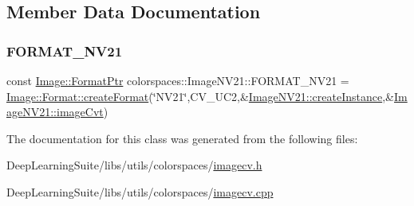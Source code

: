\subsection{Member Data Documentation}
\mbox{\label{classcolorspaces_1_1_image_n_v21_aa7e4ffadaba25b5b888123c955c63499}} 
\subsubsection{\texorpdfstring{F\+O\+R\+M\+A\+T\+\_\+\+N\+V21}{FORMAT\_NV21}}
{\footnotesize\ttfamily const \hyperlink{classcolorspaces_1_1_image_ab3978cc7acc2b5e855f8c715f09667d1}{Image\+::\+Format\+Ptr} colorspaces\+::\+Image\+N\+V21\+::\+F\+O\+R\+M\+A\+T\+\_\+\+N\+V21 = \hyperlink{classcolorspaces_1_1_image_1_1_format_ae79208f237b72cf596331ebcec2ff58b}{Image\+::\+Format\+::create\+Format}(\char`\"{}N\+V21\char`\"{},C\+V\+\_\+U\+C2,\&\hyperlink{classcolorspaces_1_1_image_n_v21_abbde9b9d723828ab4885274347b6e24c}{Image\+N\+V21\+::create\+Instance},\&\hyperlink{classcolorspaces_1_1_image_n_v21_a5ffbf749cb0a371b5f83246b994e5dc8}{Image\+N\+V21\+::image\+Cvt})\hspace{0.3cm}{\ttfamily [static]}}



The documentation for this class was generated from the following files\+:\begin{DoxyCompactItemize}
\item 
Deep\+Learning\+Suite/libs/utils/colorspaces/\hyperlink{imagecv_8h}{imagecv.\+h}\item 
Deep\+Learning\+Suite/libs/utils/colorspaces/\hyperlink{imagecv_8cpp}{imagecv.\+cpp}\end{DoxyCompactItemize}
